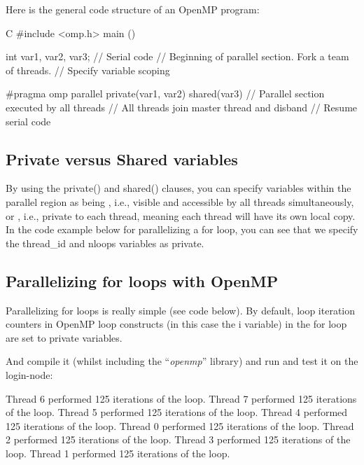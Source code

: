 Here is the general code structure of an OpenMP program:

\begin{code}{C}
#include <omp.h>
main ()  {
int var1, var2, var3;
// Serial code
// Beginning of parallel section. Fork a team of threads.
// Specify variable scoping

#pragma omp parallel private(var1, var2) shared(var3)
  {
  // Parallel section executed by all threads
  // All threads join master thread and disband
  }
// Resume serial code
}
\end{code}

\subsection{Private versus Shared variables}

By using the private() and shared() clauses, you can specify variables within
the parallel region as being , i.e., visible and accessible by
all threads simultaneously, or , i.e., private to each thread,
meaning each thread will have its own local copy. In the code example below for
parallelizing a for loop, you can see that we specify the thread\_id and nloops
variables as private.

\subsection{Parallelizing for loops with OpenMP}

Parallelizing for loops is really simple (see code below). By default, loop
iteration counters in OpenMP loop constructs (in this case the i variable) in
the for loop are set to private variables.


And compile it (whilst including the ``\emph{openmp}'' library) and run and test it on the login-node:

\begin{prompt}
Thread 6 performed 125 iterations of the loop.
Thread 7 performed 125 iterations of the loop.
Thread 5 performed 125 iterations of the loop.
Thread 4 performed 125 iterations of the loop.
Thread 0 performed 125 iterations of the loop.
Thread 2 performed 125 iterations of the loop.
Thread 3 performed 125 iterations of the loop.
Thread 1 performed 125 iterations of the loop.
\end{prompt}

